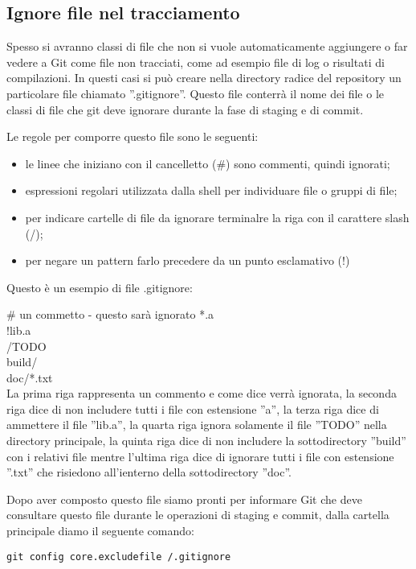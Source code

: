 \subsection{Ignore file nel tracciamento}
Spesso si avranno classi di file che non si vuole automaticamente aggiungere o far vedere a Git come file non tracciati, come ad esempio file di log o risultati di compilazioni. In questi casi si può creare nella directory radice del repository un particolare file chiamato ''.gitignore''. Questo file conterrà il nome dei file o le classi di file che git deve ignorare durante la fase di staging e di commit.

Le regole per comporre questo file sono le seguenti:

\begin{itemize}
\item le linee che iniziano con il cancelletto (\#)  sono commenti, quindi ignorati;
\item espressioni regolari utilizzata dalla shell per individuare file o gruppi di file;
\item per indicare cartelle di file da ignorare terminalre la riga con il carattere slash (/);
\item per negare un pattern farlo precedere da un punto esclamativo (!)
\end{itemize}

Questo è un esempio di file .gitignore:

\# un commetto - questo sarà ignorato
*.a\\
!lib.a\\
/TODO\\
build/\\
doc/*.txt\\

La prima riga rappresenta un commento e come dice verrà ignorata, la seconda riga dice di non includere tutti i file con estensione ''a'', la terza riga dice di ammettere il file ''lib.a'', la quarta riga ignora solamente il file ''TODO'' nella directory principale, la quinta riga dice di non includere la sottodirectory ''build'' con i relativi file mentre l'ultima riga dice di ignorare tutti i file con estensione ''.txt'' che risiedono all'ienterno della sottodirectory ''doc''.

Dopo aver composto questo file siamo pronti per informare Git che deve consultare questo file durante le operazioni di staging e commit, dalla cartella principale diamo il seguente comando:

\begin{center}
\texttt{git config core.excludefile /.gitignore}
\end{center}